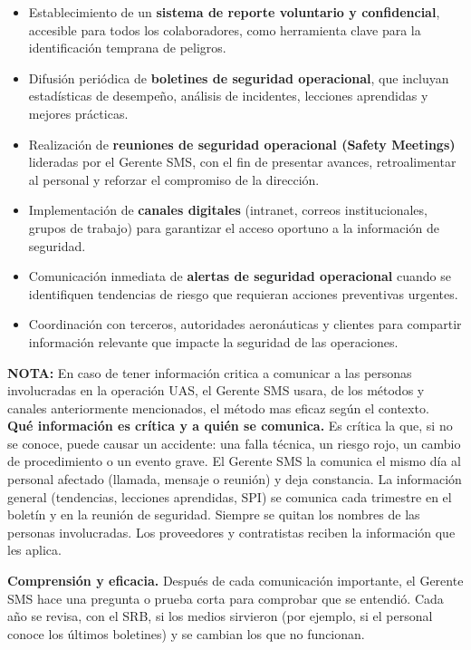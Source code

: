 \begin{itemize}
    \item Establecimiento de un \textbf{sistema de reporte voluntario y confidencial}, accesible para todos los colaboradores, como herramienta clave para la identificación temprana de peligros.
    \item Difusión periódica de \textbf{boletines de seguridad operacional}, que incluyan estadísticas de desempeño, análisis de incidentes, lecciones aprendidas y mejores prácticas.
    \item Realización de \textbf{reuniones de seguridad operacional (Safety Meetings)} lideradas por el Gerente SMS, con el fin de presentar avances, retroalimentar al personal y reforzar el compromiso de la dirección.
    \item Implementación de \textbf{canales digitales} (intranet, correos institucionales, grupos de trabajo) para garantizar el acceso oportuno a la información de seguridad.
    \item Comunicación inmediata de \textbf{alertas de seguridad operacional} cuando se identifiquen tendencias de riesgo que requieran acciones preventivas urgentes.
    \item Coordinación con terceros, autoridades aeronáuticas y clientes para compartir información relevante que impacte la seguridad de las operaciones.

\end{itemize}

\textbf{NOTA:} En caso de tener información critica a comunicar a las personas involucradas en la operación UAS, el Gerente SMS usara, de los métodos y canales anteriormente mencionados, el método mas eficaz según el contexto.\\


\textbf{Qué información es crítica y a quién se comunica.} Es crítica la que, si no se conoce, puede causar un accidente: una falla técnica, un riesgo rojo, un cambio de procedimiento o un evento grave. El Gerente SMS la comunica el mismo día al personal afectado (llamada, mensaje o reunión) y deja constancia. La información general (tendencias, lecciones aprendidas, SPI) se comunica cada trimestre en el boletín y en la reunión de seguridad. Siempre se quitan los nombres de las personas involucradas. Los proveedores y contratistas reciben la información que les aplica.

\textbf{Comprensión y eficacia.} Después de cada comunicación importante, el Gerente SMS hace una pregunta o prueba corta para comprobar que se entendió. Cada año se revisa, con el SRB, si los medios sirvieron (por ejemplo, si el personal conoce los últimos boletines) y se cambian los que no funcionan.

